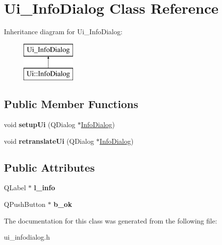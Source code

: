 \hypertarget{classUi__InfoDialog}{\section{Ui\-\_\-\-Info\-Dialog Class Reference}
\label{classUi__InfoDialog}
}
Inheritance diagram for Ui\-\_\-\-Info\-Dialog\-:\begin{figure}[H]
\begin{center}
\leavevmode
\includegraphics[height=2.000000cm]{classUi__InfoDialog}
\end{center}
\end{figure}
\subsection*{Public Member Functions}
\begin{DoxyCompactItemize}
\item 
\hypertarget{classUi__InfoDialog_a86ee02737f691e3537404a42e79cf19a}{void {\bfseries setup\-Ui} (Q\-Dialog $\ast$\hyperlink{classInfoDialog}{Info\-Dialog})}\label{classUi__InfoDialog_a86ee02737f691e3537404a42e79cf19a}

\item 
\hypertarget{classUi__InfoDialog_a017e4da9fab727a21f7ba83bb689d434}{void {\bfseries retranslate\-Ui} (Q\-Dialog $\ast$\hyperlink{classInfoDialog}{Info\-Dialog})}\label{classUi__InfoDialog_a017e4da9fab727a21f7ba83bb689d434}

\end{DoxyCompactItemize}
\subsection*{Public Attributes}
\begin{DoxyCompactItemize}
\item 
\hypertarget{classUi__InfoDialog_af7e4d2cf7d5cd3f1525b683485a1ec63}{Q\-Label $\ast$ {\bfseries l\-\_\-info}}\label{classUi__InfoDialog_af7e4d2cf7d5cd3f1525b683485a1ec63}

\item 
\hypertarget{classUi__InfoDialog_a7b16d0aaa4f153f43e6df491d8d5f9f3}{Q\-Push\-Button $\ast$ {\bfseries b\-\_\-ok}}\label{classUi__InfoDialog_a7b16d0aaa4f153f43e6df491d8d5f9f3}

\end{DoxyCompactItemize}


The documentation for this class was generated from the following file\-:\begin{DoxyCompactItemize}
\item 
ui\-\_\-infodialog.\-h\end{DoxyCompactItemize}
